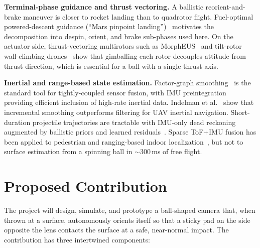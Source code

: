 \documentclass[11pt]{article}
\begin{document}
\textbf{Terminal-phase guidance and thrust vectoring.} A ballistic
reorient-and-brake maneuver is closer to rocket landing than to quadrotor
flight. Fuel-optimal powered-descent guidance (``Mars pinpoint
landing'')~\cite{acikmese2007,szmuk2020,reusable_rockets} motivates the
decomposition into despin, orient, and brake sub-phases used here. On the
actuator side, thrust-vectoring multirotors such as
MorphEUS~\cite{morpheus2025} and tilt-rotor wall-climbing
drones~\cite{myeong2018} show that gimballing each rotor decouples attitude
from thrust direction, which is essential for a ball with a single thrust
axis.

\textbf{Inertial and range-based state estimation.} Factor-graph
smoothing~\cite{dellaert2017,kaess2012isam2} is the standard tool for
tightly-coupled sensor fusion, with IMU
preintegration~\cite{forster2017imu} providing efficient inclusion of
high-rate inertial data. Indelman et al.~\cite{indelman2012} show that
incremental smoothing outperforms filtering for UAV inertial navigation.
Short-duration projectile trajectories are tractable with IMU-only dead
reckoning augmented by ballistic priors and learned
residuals~\cite{brossard2019ai,lstm_projectile}. Sparse ToF+IMU fusion has
been applied to pedestrian and ranging-based indoor
localization~\cite{tof_pedestrian,robust_ranging_imu}, but not to surface estimation from a spinning ball in $\sim$300\,ms
of free flight.

\section{Proposed Contribution}

The project will design, simulate, and prototype a ball-shaped camera
that, when thrown at a surface, autonomously orients itself so that a
sticky pad on the side opposite the lens contacts the surface at a safe,
near-normal impact. The contribution has three intertwined components:
\end{document}
